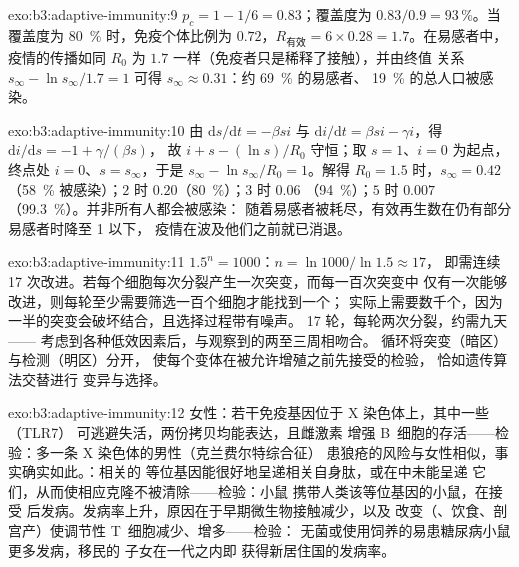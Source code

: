 \begin{solution}{exo:b3:adaptive-immunity:9}
$p_{c} = 1 - 1/6 = 0.83$；覆盖度为 $0.83/0.9 = 93\,\%$。当覆盖度为 \qty{80}{\%}
时，免疫个体比例为 $0.72$，$R_{\text{有效}} = 6\times 0.28
= 1.7$。在易感者中，疫情的传播如同 $R_{0}$ 为
$1.7$ 一样（免疫者只是稀释了接触），并由终值
关系 $s_{\infty} - \ln s_{\infty}/1.7 = 1$ 可得 $s_{\infty}
\approx 0.31$：约 \qty{69}{\%} 的易感者、
\qty{19}{\%} 的总人口被感染。
\end{solution}

\begin{solution}{exo:b3:adaptive-immunity:10}
由 $\mathrm{d}s/\mathrm{d}t = -\beta si$ 与 $\mathrm{d}i/\mathrm{d}t
= \beta si - \gamma i$，得 $\mathrm{d}i/\mathrm{d}s = -1 + \gamma/(\beta s)$，
故 $i + s - (\ln s)/R_{0}$ 守恒；取 $s = 1$、$i = 0$ 为起点，
终点处 $i = 0$、$s = s_{\infty}$，于是 $s_{\infty} - \ln
s_{\infty}/R_{0} = 1$。解得 $R_{0} = 1.5$ 时，$s_{\infty} = 0.42$
（\qty{58}{\%} 被感染）；$2$ 时 $0.20$（\qty{80}{\%}）；$3$ 时 $0.06$
（\qty{94}{\%}）；$5$ 时 $0.007$（\qty{99.3}{\%}）。并非所有人都会被感染：
随着易感者被耗尽，有效再生数在仍有部分易感者时降至 1 以下，
疫情在波及他们之前就已消退。
\end{solution}

\begin{solution}{exo:b3:adaptive-immunity:11}
$1.5^{n} = 1000$：$n = \ln 1000/\ln 1.5 \approx 17$，
即需连续 17 次改进。若每个细胞每次分裂产生一次突变，而每一百次突变中
仅有一次能够改进，则每轮至少需要筛选一百个细胞才能找到一个；
实际上需要数千个，因为一半的突变会破坏结合，且选择过程带有噪声。
17 轮，每轮两次分裂，约需九天——
考虑到各种低效因素后，与观察到的两至三周相吻合。
循环将突变（暗区）与检测（明区）分开，
使每个变体在被允许增殖之前先接受的检验，
恰如遗传算法交替进行
变异与选择。
\end{solution}

\begin{solution}{exo:b3:adaptive-immunity:12}
女性：若干免疫基因位于 X 染色体上，其中一些（TLR7）
可逃避失活，两份拷贝均能表达，且雌激素
增强 B~细胞的存活——检验：多一条 X 染色体的男性（克兰费尔特综合征）
患狼疮的风险与女性相似，事实确实如此。：相关的
等位基因能很好地呈递相关自身肽，或在中未能呈递
它们，从而使相应克隆不被清除——检验：小鼠
携带人类该等位基因的小鼠，在接受
后发病。发病率上升，原因在于早期微生物接触减少，以及
改变（、饮食、剖宫产）使调节性
T~细胞减少、增多——检验：
无菌或使用饲养的易患糖尿病小鼠更多发病，移民的
子女在一代之内即
获得新居住国的发病率。
\end{solution}

